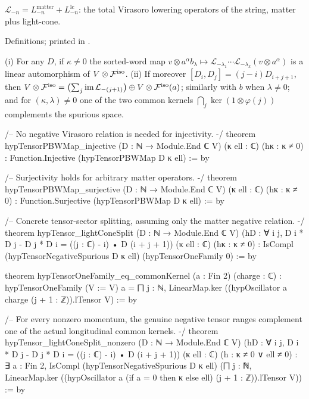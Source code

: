\begin{physics}
$\mathcal L_{-n}=L^{\mathrm{matter}}_{-n}+L^{\mathrm{lc}}_{-n}$: the total Virasoro lowering operators of the string, matter plus
light-cone.
\end{physics}

\begin{status}
Definitions; printed in .
\end{status}

\begin{theorem}\label{ch17:thm:tensorlightcone}
(i) For any $D$, if $\kappa\ne0$ the sorted-word map $v\otimes a^\alpha b_\lambda\mapsto\mathcal L_{-\lambda_1}\cdots\mathcal L_{-\lambda_k}(v\otimes a^\alpha)$ is a
linear automorphism of $V\otimes\mathcal{F}^{\mathrm{iso}}$.  (ii) If moreover $[D_i,D_j]=(j-i)D_{i+j+1}$, then
$V\otimes\mathcal{F}^{\mathrm{iso}}=\bigl(\sum_j\operatorname{im}\mathcal L_{-(j+1)}\bigr)\oplus V\otimes\mathcal{F}^{\mathrm{iso}}(a)$; similarly with $b$ when $\lambda\ne0$; and for
$(\kappa,\lambda)\ne0$ one of the two common kernels $\bigcap_j\ker(1\otimes \varphi(j))$ complements the spurious space.
\end{theorem}

\begin{leancode}
/-- No negative Virasoro relation is needed for injectivity. -/
theorem hypTensorPBWMap_injective (D : ℕ → Module.End ℂ V) (κ ell : ℂ) (hκ : κ ≠ 0) :
    Function.Injective (hypTensorPBWMap D κ ell) := by

/-- Surjectivity holds for arbitrary matter operators. -/
theorem hypTensorPBWMap_surjective (D : ℕ → Module.End ℂ V) (κ ell : ℂ) (hκ : κ ≠ 0) :
    Function.Surjective (hypTensorPBWMap D κ ell) := by

/-- Concrete tensor-sector splitting, assuming only the matter negative relation. -/
theorem hypTensor_lightConeSplit (D : ℕ → Module.End ℂ V)
    (hD : ∀ i j, D i * D j - D j * D i = ((j : ℂ) - i) • D (i + j + 1))
    (κ ell : ℂ) (hκ : κ ≠ 0) :
    IsCompl (hypTensorNegativeSpurious D κ ell) (hypTensorOneFamily 0) := by

theorem hypTensorOneFamily_eq_commonKernel (a : Fin 2) (charge : ℂ) :
    hypTensorOneFamily (V := V) a =
      ⨅ j : ℕ, LinearMap.ker ((hypOscillator a charge (j + 1 : ℤ)).lTensor V) := by

/-- For every nonzero momentum, the genuine negative tensor ranges complement
one of the actual longitudinal common kernels. -/
theorem hypTensor_lightConeSplit_nonzero (D : ℕ → Module.End ℂ V)
    (hD : ∀ i j, D i * D j - D j * D i = ((j : ℂ) - i) • D (i + j + 1))
    (κ ell : ℂ) (h : κ ≠ 0 ∨ ell ≠ 0) :
    ∃ a : Fin 2, IsCompl (hypTensorNegativeSpurious D κ ell)
      (⨅ j : ℕ, LinearMap.ker
        ((hypOscillator a (if a = 0 then κ else ell) (j + 1 : ℤ)).lTensor V)) := by
\end{leancode}

